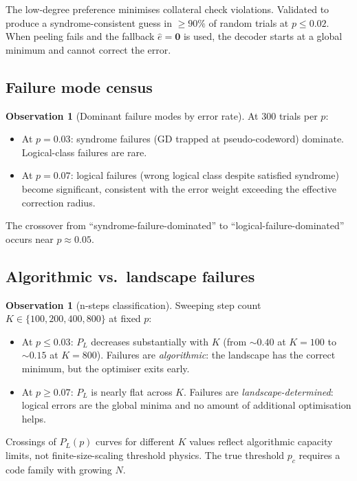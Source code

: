 \documentclass[12pt,a4paper]{article}
\theoremstyle{plain}
\theoremstyle{definition}
\newtheorem{observation}[theorem]{Observation}
\theoremstyle{remark}
\begin{document}
The low-degree preference minimises collateral check violations.
Validated to produce a syndrome-consistent guess in $\geq 90\%$ of
random trials at $p \leq 0.02$.
When peeling fails and the fallback $\hat{e}=\bm{0}$ is used, the
decoder starts at a global minimum and cannot correct the error.

\subsection{Failure mode census}

\begin{observation}[Dominant failure modes by error rate]\label{obs:failures}
At 300 trials per $p$:
\begin{itemize}[noitemsep]
\item At $p=0.03$: syndrome failures (GD trapped at pseudo-codeword) dominate.
  Logical-class failures are rare.
\item At $p=0.07$: logical failures (wrong logical class despite satisfied
  syndrome) become significant, consistent with the error weight exceeding
  the effective correction radius.
\end{itemize}
The crossover from ``syndrome-failure-dominated'' to
``logical-failure-dominated'' occurs near $p\approx 0.05$.
\end{observation}

\subsection{Algorithmic vs.\ landscape failures}

\begin{observation}[n-steps classification]\label{obs:nsteps}
Sweeping step count $K \in \{100, 200, 400, 800\}$ at fixed $p$:
\begin{itemize}[noitemsep]
\item At $p \leq 0.03$: $P_L$ decreases substantially with $K$ (from
  $\sim 0.40$ at $K=100$ to $\sim 0.15$ at $K=800$).
  Failures are \emph{algorithmic}: the landscape has the correct minimum,
  but the optimiser exits early.
\item At $p \geq 0.07$: $P_L$ is nearly flat across $K$.
  Failures are \emph{landscape-determined}: logical errors are the
  global minima and no amount of additional optimisation helps.
\end{itemize}
Crossings of $P_L(p)$ curves for different $K$ values reflect algorithmic
capacity limits, not finite-size-scaling threshold physics.
The true threshold $p_c$ requires a code family with growing $N$.
\end{observation}
\end{document}
